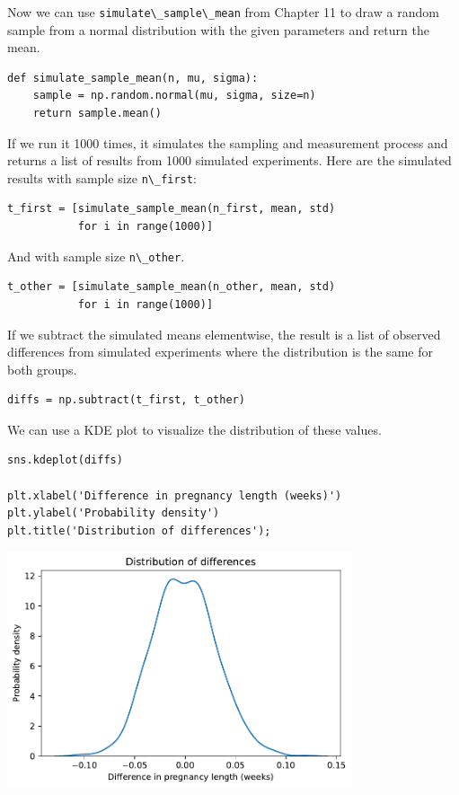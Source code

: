 Now we can use \passthrough{\lstinline!simulate\_sample\_mean!} from
Chapter 11 to draw a random sample from a normal distribution with the
given parameters and return the mean.

\begin{lstlisting}[]
def simulate_sample_mean(n, mu, sigma):
    sample = np.random.normal(mu, sigma, size=n)
    return sample.mean()
\end{lstlisting}

If we run it 1000 times, it simulates the sampling and measurement
process and returns a list of results from 1000 simulated experiments.
Here are the simulated results with sample size
\passthrough{\lstinline!n\_first!}:

\begin{lstlisting}[]
t_first = [simulate_sample_mean(n_first, mean, std)
           for i in range(1000)]
\end{lstlisting}

And with sample size \passthrough{\lstinline!n\_other!}.

\begin{lstlisting}[]
t_other = [simulate_sample_mean(n_other, mean, std)
           for i in range(1000)]
\end{lstlisting}

If we subtract the simulated means elementwise, the result is a list of
observed differences from simulated experiments where the distribution
is the same for both groups.

\begin{lstlisting}[]
diffs = np.subtract(t_first, t_other)
\end{lstlisting}

We can use a KDE plot to visualize the distribution of these values.

\begin{lstlisting}[]
sns.kdeplot(diffs)

plt.xlabel('Difference in pregnancy length (weeks)')
plt.ylabel('Probability density')
plt.title('Distribution of differences');
\end{lstlisting}

\begin{center}
\includegraphics[width=4in]{chapters/13_hypothesis_files/13_hypothesis_65_0.pdf}
\end{center}

